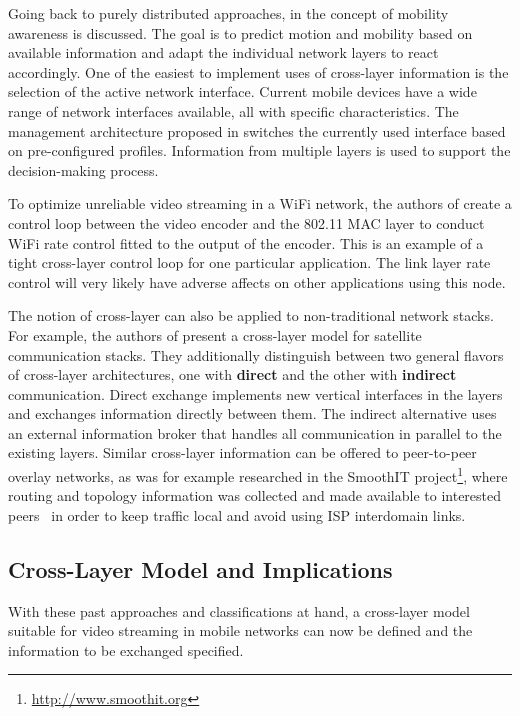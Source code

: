Going back to purely distributed approaches, in \cite{hummel2010mobilitaet} the concept of mobility awareness is discussed. The goal is to predict motion and mobility based on available information and adapt the individual network layers to react accordingly. One of the easiest to implement uses of cross-layer information is the selection of the active network interface. Current mobile devices have a wide range of network interfaces available, all with specific characteristics. The management architecture proposed in  \cite{Bonnin:2009:AMM:1503496.1503498} switches the currently used interface based on pre-configured profiles. Information from multiple layers is used to support the decision-making process.

To optimize unreliable video streaming in a WiFi network, the authors of \cite{1580941} create a control loop between the video encoder and the 802.11 \gls{MAC} layer to conduct WiFi rate control fitted to the output of the encoder. This is an example of a tight cross-layer control loop for one particular application. The link layer rate control will very likely have adverse affects on other applications using this node.

The notion of cross-layer can also be applied to non-traditional network stacks. For example, the authors of \cite{4656786} present a cross-layer model for satellite communication stacks. They additionally distinguish between two general flavors of cross-layer architectures, one with \textbf{direct} and the other with \textbf{indirect} communication. Direct exchange implements new vertical interfaces in the layers and exchanges information directly between them. The indirect alternative uses an external information broker that handles all communication in parallel to the existing layers. Similar cross-layer information can be offered to peer-to-peer overlay networks, as was for example researched in the SmoothIT project\footnote{\url{http://www.smoothit.org}}, where routing and topology information was collected and made available to interested peers~\cite{oechsner2009pushing} in order to keep traffic local and avoid using \acrshort{ISP} interdomain links.


\subsection{Cross-Layer Model and Implications}

With these past approaches and classifications at hand, a cross-layer model suitable for video streaming in mobile networks can now be defined and the information to be exchanged specified.

